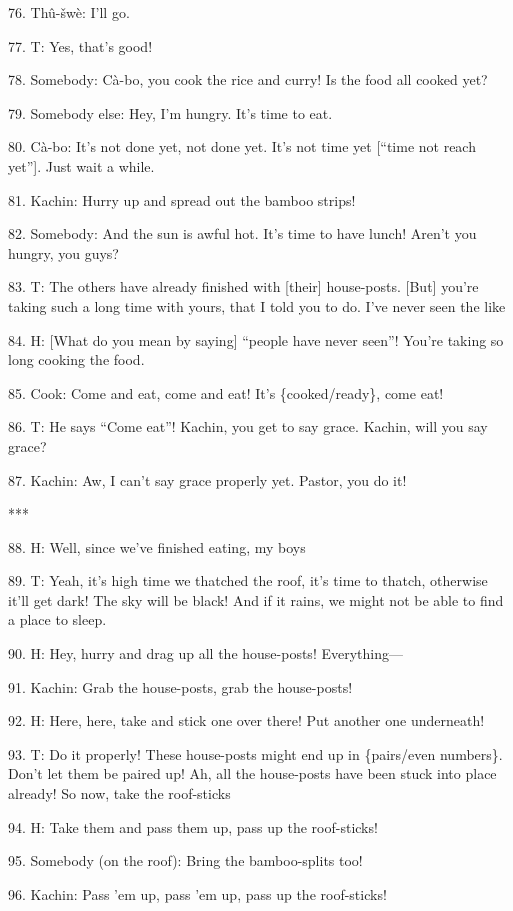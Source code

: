 76. Thû-šwè: I'll go.

77. T: Yes, that's good!

78. Somebody: Cà-bo, you cook the rice and curry!  Is the food all cooked yet?

79. Somebody else: Hey, I'm hungry.  It's time to eat.

80. Cà-bo: It's not done yet, not done yet.  It's not time yet [``time not reach
yet''].  Just wait a while.

81. Kachin: Hurry up and spread out the bamboo strips!

82. Somebody: And the sun is awful hot.  It's time to have lunch!  Aren't you hungry,
you guys?

83. T: The others have already finished with [their] house-posts. [But] you're
taking such a long time with yours, that I told you to do.  I've never seen the
like

84. H: [What do you mean by saying] ``people have never seen''!  You're taking
so long cooking the food.

85. Cook: Come and eat, come and eat!  It's \{cooked/ready\}, come eat!

86. T: He says ``Come eat''!  Kachin, you get to say grace.  Kachin, will you say
grace?

87. Kachin: Aw, I can't say grace properly yet.  Pastor, you do it!

***

88. H: Well, since we've finished eating, my boys

89. T: Yeah, it's high time we thatched the roof, it's time to thatch, otherwise
it'll get dark!  The sky will be black!  And if it rains, we might not be able
to find a place to sleep.

90. H: Hey, hurry and drag up all the house-posts!  Everything---

91. Kachin: Grab the house-posts, grab the house-posts!

92. H: Here, here, take and stick one over there!  Put another one underneath!

93. T: Do it properly!  These house-posts might end up in \{pairs/even numbers\}.
Don't let them be paired up!  Ah, all the house-posts have been stuck into place
already!  So now, take the roof-sticks

94. H: Take them and pass them up, pass up the roof-sticks!

95. Somebody (on the roof): Bring the bamboo-splits too!

96. Kachin: Pass 'em up, pass 'em up, pass up the roof-sticks!


